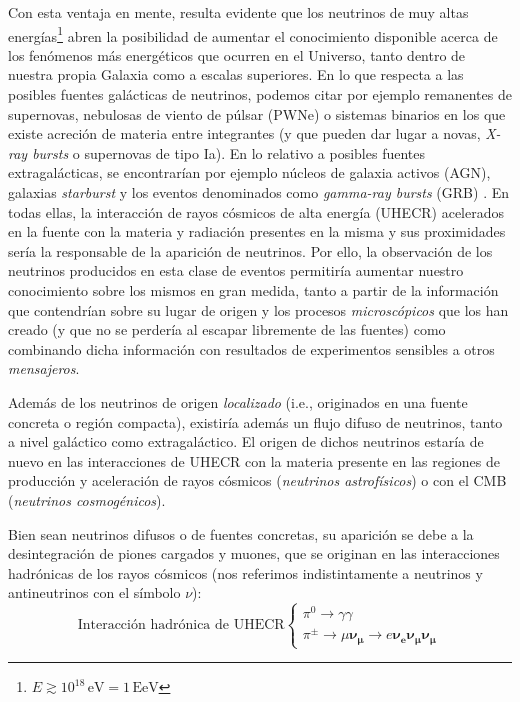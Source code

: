 \documentclass[12 pt, a4paper]{article} %
\numberwithin{equation}{section}
\numberwithin{figure}{section}
\numberwithin{table}{section}
\begin{document}
	Con esta ventaja en mente, resulta evidente que los neutrinos de muy altas energías\footnote{ $E\gtrsim 10^{18}\,\mathrm{eV}=1\,\mathrm{EeV}$} abren la posibilidad de aumentar el conocimiento disponible acerca de los fenómenos más energéticos que ocurren en el Universo, tanto dentro de nuestra propia Galaxia como a escalas superiores. En lo que respecta a las posibles fuentes galácticas de neutrinos, podemos citar por ejemplo remanentes de supernovas, nebulosas de viento de púlsar (PWNe) o sistemas binarios en los que existe acreción de materia entre integrantes (y que pueden dar lugar a novas, \textit{X-ray bursts} o supernovas de tipo Ia). En lo relativo a posibles fuentes extragalácticas, se encontrarían por ejemplo núcleos de galaxia activos (AGN), galaxias \textit{starburst} y los eventos denominados como \textit{gamma-ray bursts} (GRB) \cite{gaisser2018neutrino, gaisser2016cosmic, gaisser1995particle}. En todas ellas, la interacción de rayos cósmicos de alta energía (UHECR) acelerados en la fuente con la materia y radiación presentes en la misma y sus proximidades sería la responsable de la aparición de neutrinos. Por ello, la observación de los neutrinos producidos en esta clase de eventos permitiría aumentar nuestro conocimiento sobre los mismos en gran medida, tanto a partir de la información que contendrían sobre su lugar de origen y los procesos \textit{microscópicos} que los han creado (y que no se perdería al escapar libremente de las fuentes) como combinando dicha información con resultados de experimentos sensibles a otros \textit{mensajeros}.
	
	Además de los neutrinos de origen \textit{localizado} (i.e., originados en una fuente concreta o región compacta), existiría además un flujo difuso de neutrinos, tanto a nivel galáctico como extragaláctico. El origen de dichos neutrinos estaría de nuevo en las interacciones de UHECR con la materia presente en las regiones de producción y aceleración de rayos cósmicos (\textit{neutrinos astrofísicos}) o con el CMB (\textit{neutrinos cosmogénicos}). 
	
	Bien sean neutrinos difusos o de fuentes concretas, su aparición se debe a la desintegración de piones cargados y muones, que se originan en las interacciones hadrónicas de los rayos cósmicos (nos referimos indistintamente a neutrinos y antineutrinos con el símbolo $\nu$):
	\begin{equation}
		\text{Interacción hadrónica de UHECR}\left\{\begin{array}{l}\pi^0\rightarrow \gamma\gamma\\\pi^\pm\rightarrow \mu \bm{\nu_\mu}\rightarrow e \bm{\nu_e \nu_\mu \nu_\mu} \end{array}\right.\label{ec11}
	\end{equation}
	
\end{document}
